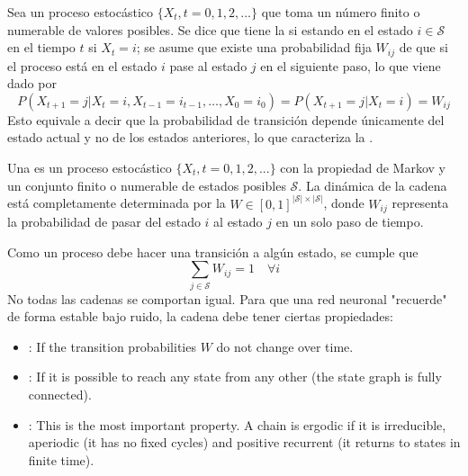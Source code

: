 \begin{definicion}
    Sea un proceso estocástico $\{X_t, t = 0,1,2,...\}$ que toma un número finito o numerable de valores posibles. Se dice que tiene la  si estando en el estado $i \in \mathcal{S}$ en el tiempo $t$ si $X_t = i$; se asume que existe una probabilidad fija $W_{ij}$ de que si el proceso está en el estado $i$ pase al estado $j$ en el siguiente paso, lo que viene dado por
    \begin{equation*}
        P(X_{t+1} = j | X_t = i, X_{t-1} = i_{t-1}, \ldots, X_0 = i_0) = P(X_{t+1} = j | X_t = i) = W_{ij}
    \end{equation*}
    Esto equivale a decir que la probabilidad de transición depende únicamente del estado actual y no de los estados anteriores, lo que caracteriza la .
\end{definicion}

\begin{definicion}
    Una  es un proceso estocástico $\{X_t, t = 0,1,2,...\}$ con la propiedad de Markov y un conjunto finito o numerable de estados posibles $\mathcal{S}$. La dinámica de la cadena está completamente determinada por la  $W\in [0,1]^{|\mathcal{S}|\times |\mathcal{S}|}$, donde $W_{ij}$ representa la probabilidad de pasar del estado $i$ al estado $j$ en un solo paso de tiempo.
\end{definicion}

\noindent
Como un proceso debe hacer una transición a algún estado, se cumple que
\begin{equation*}
    \sum_{j \in \mathcal{S}} W_{ij} = 1 \quad \forall i
\end{equation*}
No todas las cadenas se comportan igual. Para que una red neuronal "recuerde" de forma estable bajo ruido, la cadena debe tener ciertas propiedades:
\begin{itemize}
    \item {}: If the transition probabilities $W$ do not change over time.
    \item {}: If it is possible to reach any state from any other (the state graph is fully connected).
    \item {}: This is the most important property. A chain is ergodic if it is irreducible, aperiodic (it has no fixed cycles) and positive recurrent (it returns to states in finite time).
\end{itemize}

